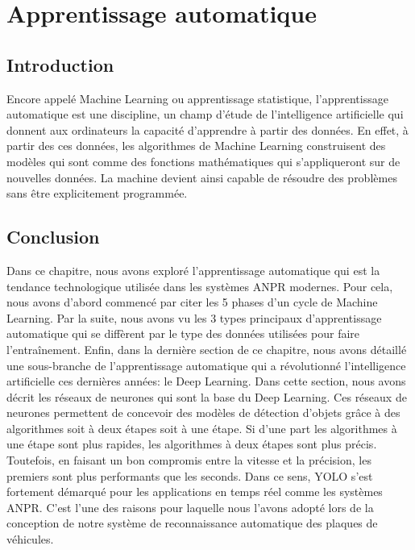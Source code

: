 \chapter{\textbf{Apprentissage automatique}}
    \section{Introduction}
    Encore appelé Machine Learning ou apprentissage statistique, l’apprentissage automatique est une discipline, un champ d’étude de l’intelligence artificielle qui donnent aux ordinateurs la capacité d’apprendre à partir des données. En effet, à partir des ces données, les algorithmes de Machine Learning construisent des modèles qui sont comme des fonctions mathématiques qui s’appliqueront sur de nouvelles données. La machine devient ainsi capable de résoudre des problèmes sans être explicitement programmée. 
    
    
    

    \section{Conclusion}
    Dans ce chapitre, nous avons exploré l’apprentissage automatique qui est la tendance technologique utilisée dans les systèmes ANPR modernes. Pour cela, nous avons d’abord commencé par citer les 5 phases d’un cycle de Machine Learning. Par la suite, nous avons vu les 3 types principaux d’apprentissage automatique qui se diffèrent par le type des données utilisées pour faire l’entraînement. Enfin,  dans la dernière section de ce chapitre, nous avons détaillé une sous-branche de l’apprentissage automatique qui a révolutionné l’intelligence artificielle ces dernières années: le Deep Learning.  Dans cette section, nous avons décrit les réseaux de neurones qui sont la base du Deep Learning. Ces réseaux de neurones permettent de concevoir des modèles de détection d’objets grâce à des algorithmes soit à deux étapes soit à une étape. Si d’une part les algorithmes à une étape sont plus rapides, les algorithmes à deux étapes sont plus précis. Toutefois, en faisant un bon compromis entre la vitesse et la précision, les premiers sont plus performants que les seconds. Dans ce sens, YOLO s’est fortement démarqué pour les applications en temps réel comme les systèmes ANPR. C’est l’une des raisons pour laquelle nous l’avons adopté lors de la conception de notre système de reconnaissance automatique des plaques de véhicules.